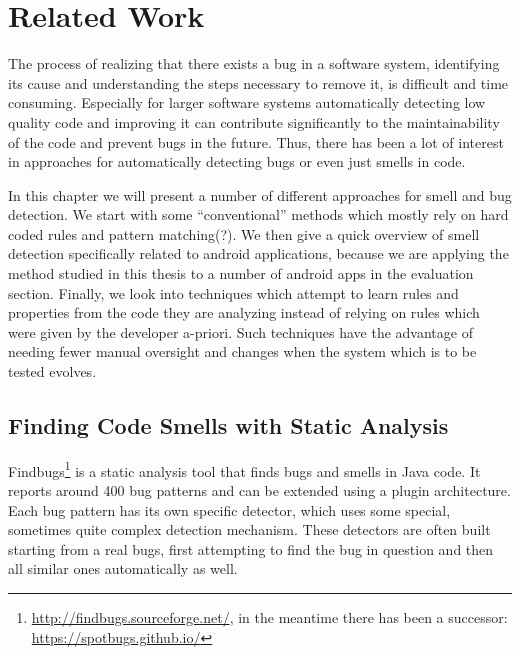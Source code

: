 \chapter{Related Work}\label{ch:relWork}



The process of realizing that there exists a bug in a software system, identifying its cause and understanding the steps necessary to remove it, is difficult and time consuming.
Especially for larger software systems automatically detecting low quality code and improving it can contribute significantly to the maintainability of the code and prevent bugs in the future.
Thus, there has been a lot of interest in approaches for automatically detecting bugs or even just smells in code.

In this chapter we will present a number of different approaches for smell and bug detection.
We start with some ``conventional'' methods which mostly rely on hard coded rules and pattern matching(?).
We then give a quick overview of smell detection specifically related to android applications, because we are applying the method studied in this thesis to a number of android apps in the evaluation section.
Finally, we look into techniques which attempt to learn rules and properties from the code they are analyzing instead of relying on rules which were given by the developer a-priori.
Such techniques have the advantage of needing fewer manual oversight and changes when the system which is to be tested evolves.

\section{Finding Code Smells with Static Analysis}

Findbugs\footnote{\url{http://findbugs.sourceforge.net/}, in the meantime there has been a successor: \url{https://spotbugs.github.io/}} is a static analysis tool that finds bugs and smells in Java code.
It reports around 400 bug patterns and can be extended using a plugin architecture.
Each bug pattern has its own specific detector, which uses some special, sometimes quite complex detection mechanism.
These detectors are often built starting from a real bugs, first attempting to find the bug in question and then all similar ones automatically as well.

